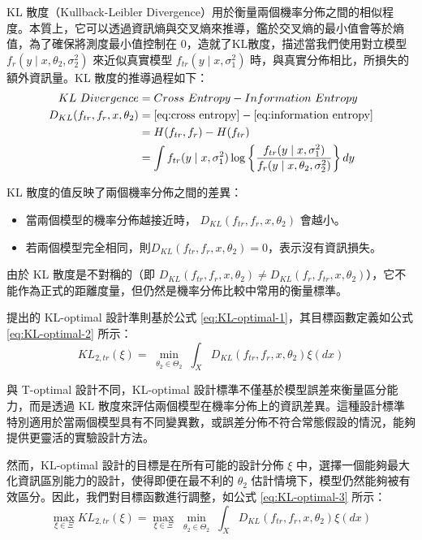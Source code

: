 \hspace*{8mm} KL 散度（Kullback-Leibler Divergence）用於衡量兩個機率分佈之間的相似程度。本質上，它可以透過資訊熵與交叉熵來推導，鑑於交叉熵的最小值會等於熵值，為了確保將測度最小值控制在 0，造就了KL散度，描述當我們使用對立模型 $f_r(y \mid x, \theta_2, \sigma^2_2)$ 來近似真實模型 $f_{tr}(y \mid x, \sigma^2_1)$ 時，與真實分佈相比，所損失的額外資訊量。KL 散度的推導過程如下：
\begin{align}
KL\ Divergence &= Cross\ Entropy - Information\ Entropy \notag \\
D_{KL}(f_{tr},f_r,x,\theta_2) &= \eqref{eq:cross entropy} - \eqref{eq:information entropy} \notag \\
&= H(f_{tr}, f_r) - H(f_{tr}) \notag \\
&= \int f_{tr}(y \mid x, \sigma^2_1) \log \left\{ \frac{f_{tr}(y \mid x, \sigma^2_1)}{f_r(y \mid x, \theta_2, \sigma^2_2)} \right\} dy \label{eq:KL-optimal-1}
\end{align}

KL 散度的值反映了兩個機率分佈之間的差異：
\begin{itemize}
\item 當兩個模型的機率分佈越接近時， $D_{KL}(f_{tr},f_r,x,\theta_2)$  會越小。
\item 若兩個模型完全相同，則$ D_{KL}(f_{tr},f_r,x,\theta_2) = 0$，表示沒有資訊損失。
\end{itemize}

\hspace*{8mm} 由於 KL 散度是不對稱的（即 $D_{KL}(f_{tr},f_r,x,\theta_2) \neq D_{KL}(f_r,f_{tr},x,\theta_2)$），它不能作為正式的距離度量，但仍然是機率分佈比較中常用的衡量標準。

\hspace*{8mm} \cite{lopez2007optimal} 提出的 KL-optimal 設計準則基於公式 \eqref{eq:KL-optimal-1}，其目標函數定義如公式 \eqref{eq:KL-optimal-2} 所示：
\begin{equation}\label{eq:KL-optimal-2}
KL_{2,tr}(\xi)=\min_{\substack{\theta_2\in \Theta_2}}\int_{X}D_{KL}(f_{tr},f_r,x,\theta_2) \xi(dx)
\end{equation}

\hspace*{8mm} 與 T-optimal 設計不同，KL-optimal 設計標準不僅基於模型誤差來衡量區分能力，而是透過 KL 散度來評估兩個模型在機率分佈上的資訊差異。這種設計標準特別適用於當兩個模型具有不同變異數，或誤差分佈不符合常態假設的情況，能夠提供更靈活的實驗設計方法。

\hspace*{8mm} 然而，KL-optimal 設計的目標是在所有可能的設計分佈 $\xi$ 中，選擇一個能夠最大化資訊區別能力的設計，使得即便在最不利的 $\theta_2$ 估計情境下，模型仍然能夠被有效區分。因此，我們對目標函數進行調整，如公式 \eqref{eq:KL-optimal-3} 所示：
\begin{equation}\label{eq:KL-optimal-3}
\max_{\xi\in \Xi} KL_{2,tr}(\xi)=\max_{\xi\in \Xi} \min_{\substack{\theta_2\in \Theta_2}}\int_{X}D_{KL}(f_{tr},f_r,x,\theta_2) \xi(dx)
\end{equation}

